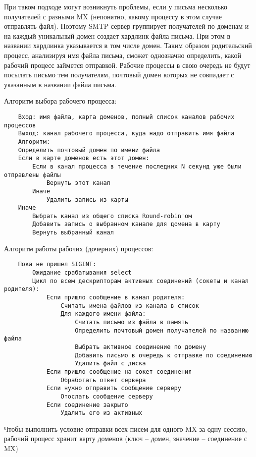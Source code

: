 \documentclass[a4paper,12pt]{report}
\begin{document}
При таком подходе могут возникнуть проблемы, если у письма несколько получателей с разными MX (непонятно, какому процессу в этом случае отправлять файл). Поэтому SMTP-сервер группирует получателей по доменам и на каждый уникальный домен создает хардлинк файла письма. При этом в названии хардлинка указывается в том числе домен. Таким образом родительский процесс, анализируя имя файла письма, сможет однозначно определить, какой рабочий процесс займется отправкой. Рабочие процессы в свою очередь не будут посылать письмо тем получателям, почтовый домен которых не совпадает с указанным в названии файла письма.


Алгоритм выбора рабочего процесса:
\begin{verbatim}
    Вход: имя файла, карта доменов, полный список каналов рабочих процессов
    Выход: канал рабочего процесса, куда надо отправить имя файла
    Алгоритм:
    Определить почтовый домен по имени файла
    Если в карте доменов есть этот домен:
        Если в канал процесса в течение последних N секунд уже были отправлены файлы
            Вернуть этот канал
        Иначе
            Удалить запись из карты
    Иначе
        Выбрать канал из общего списка Round-robin'ом
        Добавить запись о выбранном канале для домена в карту
        Вернуть выбранный канал
\end{verbatim}

Алгоритм работы рабочих (дочерних) процессов:

\begin{verbatim}
    Пока не пришел SIGINT:
        Ожидание срабатывания select
        Цикл по всем дескрипторам активных соединений (сокеты и канал родителя):
            Если пришло сообщение в канал родителя:
                Считать имена файлов из канала в список
                Для каждого имени файла:
                    Считать письмо из файла в память
                    Определить почтовый домен получателей по названию файла
                    Выбрать активное соединение по домену
                    Добавить письмо в очередь к отправке по соединению
                    Удалить файл с диска
            Если пришло сообщение на сокет соединения
                Обработать ответ сервера
            Если нужно отправить сообщение серверу
                Отослать сообщение серверу
            Если соединение закрыто
                Удалить его из активных
\end{verbatim}

Чтобы выполнить условие отправки всех писем для одного MX за одну сессию, рабочий процесс хранит карту доменов (ключ -- домен, значение -- соединение с MX)
\end{document}
